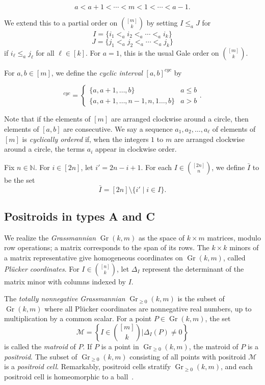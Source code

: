 \documentclass[ALCO,ThmDefs,Unicode,epreuves]{cedram}
\DeclareMathOperator{\Gr}{Gr}
\begin{document}
\begin{equation}
	a < a + 1 < \cdots < m < 1 < \cdots < a-1.
\end{equation}

We extend this to a partial order on $\binom{[m]}{k}$ by setting $I \leq_a J$ for
\[I = \{i_1 <_a i_2 <_a \cdots <_a i_k\}\]
\[J = \{j_1 <_a j_2 <_a \cdots <_a j_k\}\]
if $i_{\ell} \leq_a j_{\ell}$ for all $\ell \in [k]$.
For $a = 1$, this is the usual Gale order on $\binom{[m]}{k}$.
 
For $a,b \in [m]$, we define the \emph{cyclic interval} $[a,b]^{cyc}$ by

\begin{equation}
	[a,b]^{cyc} = \begin{cases}
	\{a,a+1,\ldots,b\} & a \leq b\\
	\{a,a+1,\ldots,n-1,n,1 \ldots,b\} & a > b
	\end{cases}.
\end{equation} 

Note that if the elements of $[m]$ are arranged clockwise around a circle, then elements of $[a,b]$ are consecutive. We say a sequence $a_1,a_2,\ldots,a_{\ell}$ of elements of $[m]$ is \emph{cyclically ordered} if, when the integers $1$ to $m$ are arranged clockwise around a circle, the terms $a_i$ appear in clockwise order.

Fix $n \in \mathbb{N}$. For $i \in [2n]$, let $i' = 2n - i + 1$. For each $I \in \binom{[2n]}{n}$, we define $\bar{I}$ to be the set 
\begin{equation}
	\bar{I} = [2n] \setminus \{i' \mid i \in I\}.
\end{equation} 

\subsection{Positroids in types A and C}

We realize the \emph{Grassmannian} $\Gr(k,m)$ as the space of $k \times m$ matrices, modulo row operations; a matrix corresponds to the span of its rows. The $k \times k$ minors of a matrix representative give homogeneous coordinates on $\Gr(k,m)$, called \emph{Pl{\"u}cker coordinates}. For $I \in \binom{[n]}{k}$, let $\Delta_I$ represent the determinant of the matrix minor with columns indexed by $I$.

The \emph{totally nonnegative Grassmannian} $\Gr_{\geq 0}(k,m)$ is the subset of $\Gr(k,m)$ where all Pl{\"u}cker coordinates are nonnegative real numbers, up to multiplication by a common scalar. For a point $P \in \Gr(k,m)$, the set 
\[
\mathcal{M} = \left\{I \in \binom{[m]}{k} \mathrel{\Bigg|} \Delta_I(P) \neq 0\right\}
\]
is called the \emph{matroid} of $P$. If $P$ is a point in $\Gr_{\geq 0}(k,m)$, the matroid of $P$ is a \emph{positroid}. The subset of $\Gr_{\geq 0}(k,m)$ consisting of all points with positroid $\mathcal{M}$ is a \emph{positroid cell}. Remarkably, positroid cells stratify $\Gr_{\geq 0}(k,m)$, and each positroid cell is homeomorphic to a ball~\cite{Pos06}. 
\end{document}
